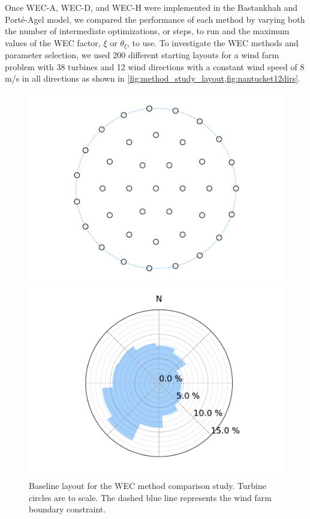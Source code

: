 \documentclass[a4paper]{jpconf}
\begin{document}
Once WEC-A, WEC-D, and WEC-H were implemented in the Bastankhah and Port\'{e}-Agel model, we compared the performance of each method by varying both the number of intermediate optimizations, or steps, to run and the maximum values of the WEC factor, $\xi$ or $\theta_\xi$, to use. To investigate the WEC methods and parameter selection, we used 200 different starting layouts for a wind farm problem with 38 turbines and 12 wind directions with a constant wind speed of 8 m/s in all directions as shown in \cref{fig:method_study_layout,fig:nantucket12dirs}. 

\begin{figure}[h!]
	\centering
	\begin{minipage}[t]{18pc}
		\centering
		\includegraphics[width=\textwidth, trim={1.5cm, 0cm, 2.0cm, 0cm}, clip]{final_images/layouts/38_turb_start.pdf}
		\caption{Baseline layout for the WEC method comparison study. Turbine circles are to scale. The dashed blue line represents the wind farm boundary constraint.}
		\label{fig:method_study_layout}
	\end{minipage}\hspace{1pc}%
	\begin{minipage}[t]{18pc}
		\centering
		\includegraphics[width=\textwidth, trim={2.0cm 0cm 1.5cm 0cm}, clip]{final_images/windroses/freqwindrose_12_dir.pdf}

\end{minipage}
\end{figure}
\end{document}
